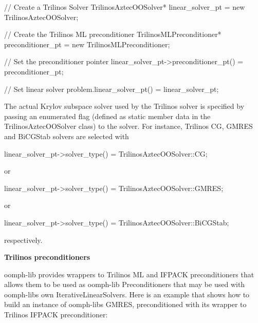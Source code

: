  
\begin{DoxyCodeInclude}
  \textcolor{comment}{// Create a Trilinos Solver }
  TrilinosAztecOOSolver* linear\_solver\_pt = \textcolor{keyword}{new} TrilinosAztecOOSolver;
  
  \textcolor{comment}{// Create the Trilinos ML preconditioner}
  TrilinosMLPreconditioner* preconditioner\_pt = \textcolor{keyword}{new} TrilinosMLPreconditioner;

  \textcolor{comment}{// Set the preconditioner pointer}
  linear\_solver\_pt->preconditioner\_pt() = preconditioner\_pt;

  \textcolor{comment}{// Set linear solver}
  problem.linear\_solver\_pt() = linear\_solver\_pt;

\end{DoxyCodeInclude}


The actual Krylov subspace solver used by the {\ttfamily Trilinos} solver is specified by passing an enumerated flag (defined as static member data in the {\ttfamily Trilinos\+Aztec\+O\+O\+Solver} class) to the solver. For instance, {\ttfamily Trilinos\textquotesingle{}} CG, G\+M\+R\+ES and Bi\+C\+G\+Stab solvers are selected with

 
\begin{DoxyCodeInclude}
      linear\_solver\_pt->solver\_type() = TrilinosAztecOOSolver::CG;

\end{DoxyCodeInclude}


or


\begin{DoxyCodeInclude}
      linear\_solver\_pt->solver\_type() = TrilinosAztecOOSolver::GMRES;

\end{DoxyCodeInclude}


or


\begin{DoxyCodeInclude}
      linear\_solver\_pt->solver\_type() = TrilinosAztecOOSolver::BiCGStab;

\end{DoxyCodeInclude}


respectively.

{\bfseries Trilinos preconditioners}

{\ttfamily oomph-\/lib} provides wrappers to {\ttfamily Trilinos\textquotesingle{}} ML and I\+F\+P\+A\+CK preconditioners that allows them to be used as {\ttfamily oomph-\/lib} {\ttfamily Preconditioners} that may be used with {\ttfamily oomph-\/lib\textquotesingle{}s} own {\ttfamily Iterative\+Linear\+Solvers}. Here is an example that shows how to build an instance of {\ttfamily oomph-\/lib\textquotesingle{}s} {\ttfamily G\+M\+R\+ES}, preconditioned with its wrapper to {\ttfamily Trilinos\textquotesingle{}} {\ttfamily I\+F\+P\+A\+CK} preconditioner\+:

